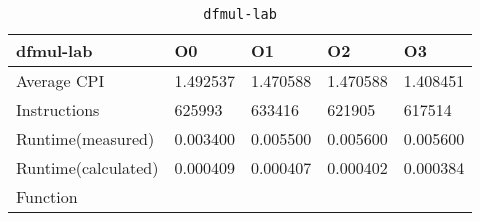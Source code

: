 \begin{table}[ht!]
\centering
\caption{\texttt{dfmul-lab}}
\label{tab:dfmul-lab}
\begin{tabular}{|l|l|l|l|l|}
\hline
\textbf{dfmul-lab}	&	\textbf{O0}	&	\textbf{O1}	&	\textbf{O2}	&	\textbf{O3}	\\\hline\hline
Average CPI	&	1.492537	&	1.470588	&	1.470588	&	1.408451	\\\hline
Instructions	&	625993	&	633416	&	621905	&	617514	\\\hline
Runtime(measured)	&	0.003400	&	0.005500	&	0.005600	&	0.005600	\\\hline
Runtime(calculated)	&	0.000409	&	0.000407	&	0.000402	&	0.000384	\\\hline
Function	&		&		&		&		\\\hline
\end{tabular}
\end{table}
